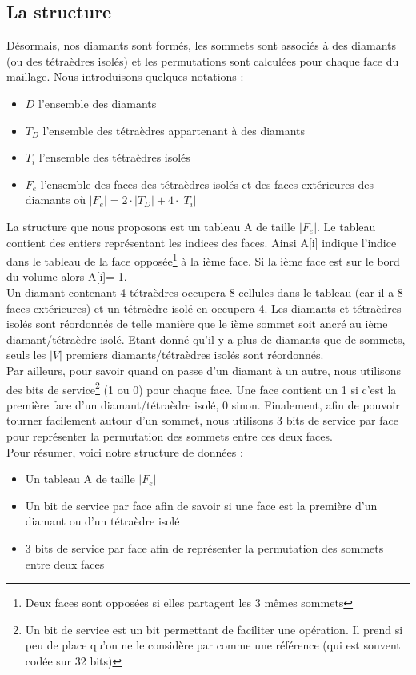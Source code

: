 \subsection{La structure}
\noindent
Désormais, nos diamants sont formés, les sommets sont associés à des diamants (ou des tétraèdres isolés) et les permutations sont calculées pour chaque face du maillage. Nous introduisons quelques notations :
\begin{itemize}
\item $D$ l'ensemble des diamants
\item $T_D$ l'ensemble des tétraèdres appartenant à des diamants
\item $T_i$ l'ensemble des tétraèdres isolés
\item $F_e$ l'ensemble des faces des tétraèdres isolés et des faces extérieures des diamants où $|F_e|=2\cdot |T_D|+4\cdot |T_i|$\\
\end{itemize}
\noindent
La structure que nous proposons est un tableau A de taille $|F_e|$. Le tableau contient des entiers représentant les indices des faces. Ainsi A[i] indique l'indice dans le tableau de la face opposée\footnote{Deux faces sont opposées si elles partagent les 3 mêmes sommets} à la ième face. Si la ième face est sur le bord du volume alors A[i]=-1.\\ 
Un diamant contenant 4 tétraèdres occupera 8 cellules dans le tableau (car il a 8 faces extérieures) et un tétraèdre isolé en occupera 4. Les diamants et tétraèdres isolés sont réordonnés de telle manière que le ième sommet soit ancré au ième diamant/tétraèdre isolé. Etant donné qu'il y a plus de diamants que de sommets, seuls les $|V|$ premiers diamants/tétraèdres isolés sont réordonnés.\\
Par ailleurs, pour savoir quand on passe d'un diamant à un autre, nous utilisons des bits de service\footnote{Un bit de service est un bit permettant de faciliter une opération. Il prend si peu de place qu'on ne le considère par comme une référence (qui est souvent codée sur 32 bits)} (1 ou 0) pour chaque face. Une face contient un 1 si c'est la première face d'un diamant/tétraèdre isolé, 0 sinon. Finalement, afin de pouvoir tourner facilement autour d'un sommet, nous utilisons 3 bits de service par face pour représenter la permutation des sommets entre ces deux faces.\\
Pour résumer, voici notre structure de données :
\begin{itemize}
\item Un tableau A de taille $|F_e|$
\item Un bit de service par face afin de savoir si une face est la première d'un diamant ou d'un tétraèdre isolé
\item 3 bits de service par face afin de représenter la permutation des sommets entre deux faces
\end{itemize}
